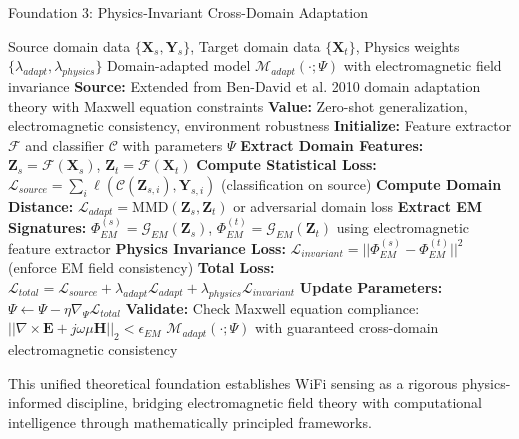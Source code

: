 \documentclass[journal]{IEEEtran}
\begin{document}
\begin{algorithm}[h]
\caption{Foundation 3: Physics-Invariant Cross-Domain Adaptation}
\label{alg:domain_adaptation_foundation}
\begin{algorithmic}[1]
\REQUIRE Source domain data $\{\mathbf{X}_s, \mathbf{Y}_s\}$, Target domain data $\{\mathbf{X}_t\}$, Physics weights $\{\lambda_{adapt}, \lambda_{physics}\}$
\ENSURE Domain-adapted model $\mathcal{M}_{adapt}(\cdot; \Psi)$ with electromagnetic field invariance
\STATE \textbf{Source:} Extended from Ben-David et al. 2010 domain adaptation theory \cite{ben2010theory} with Maxwell equation constraints
\STATE \textbf{Value:} Zero-shot generalization, electromagnetic consistency, environment robustness
\STATE \textbf{Initialize:} Feature extractor $\mathcal{F}$ and classifier $\mathcal{C}$ with parameters $\Psi$
\STATE \textbf{Extract Domain Features:} $\mathbf{Z}_s = \mathcal{F}(\mathbf{X}_s)$, $\mathbf{Z}_t = \mathcal{F}(\mathbf{X}_t)$
\STATE \textbf{Compute Statistical Loss:} $\mathcal{L}_{source} = \sum_{i} \ell(\mathcal{C}(\mathbf{Z}_{s,i}), \mathbf{Y}_{s,i})$ (classification on source)
\STATE \textbf{Compute Domain Distance:} $\mathcal{L}_{adapt} = \text{MMD}(\mathbf{Z}_s, \mathbf{Z}_t)$ or adversarial domain loss
\STATE \textbf{Extract EM Signatures:} $\Phi_{EM}^{(s)} = \mathcal{G}_{EM}(\mathbf{Z}_s)$, $\Phi_{EM}^{(t)} = \mathcal{G}_{EM}(\mathbf{Z}_t)$ using electromagnetic feature extractor
\STATE \textbf{Physics Invariance Loss:} $\mathcal{L}_{invariant} = ||\Phi_{EM}^{(s)} - \Phi_{EM}^{(t)}||^2$ (enforce EM field consistency)
\STATE \textbf{Total Loss:} $\mathcal{L}_{total} = \mathcal{L}_{source} + \lambda_{adapt} \mathcal{L}_{adapt} + \lambda_{physics} \mathcal{L}_{invariant}$
\STATE \textbf{Update Parameters:} $\Psi \leftarrow \Psi - \eta \nabla_{\Psi} \mathcal{L}_{total}$
\STATE \textbf{Validate:} Check Maxwell equation compliance: $||\nabla \times \mathbf{E} + j\omega\mu\mathbf{H}||_2 < \epsilon_{EM}$
\RETURN $\mathcal{M}_{adapt}(\cdot; \Psi)$ with guaranteed cross-domain electromagnetic consistency
\end{algorithmic}
\end{algorithm}

This unified theoretical foundation establishes WiFi sensing as a rigorous physics-informed discipline, bridging electromagnetic field theory with computational intelligence through mathematically principled frameworks.

\end{document}

